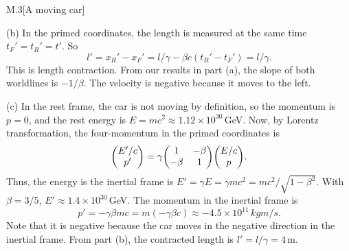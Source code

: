 \documentclass[12pt]{article}
\begin{document}
\begin{problem}{M.3}[A moving car]
\begin{solution}
(b) In the primed coordinates, the length is measured at the same time
$t_F'=t_R'=t'$. So
\begin{equation}
    l'=x_R'-x_F'=l/\gamma-\beta c(t_R'-t_F')=l/\gamma.
\end{equation}
This is length contraction. From our results in part (a), the slope of both
worldlines is $-1/\beta$. The velocity is negative because it moves to the left.

(c) In the rest frame, the car is not moving by definition, so the momentum is
$p=0$, and the rest energy is $E=mc^2\approx1.12\times10^{30}$\,\si{GeV}. Now,
by Lorentz transformation, the four-momentum in the primed coordinates is
\begin{equation}
    \mqty(E'/c\\p')=\gamma\mqty(1&-\beta\\-\beta&1)\mqty(E/c\\p).
\end{equation}
Thus, the energy is the inertial frame is $E'=\gamma E=\gamma
mc^2=mc^2/\sqrt{1-\beta^2}$. With $\beta=3/5$,
$E'\approx1.4\times10^{30}$\,\si{GeV}. The momentum in the inertial frame is
\begin{equation}
    p'=-\gamma\beta mc=m(-\gamma \beta c)
    \approx-4.5\times10^{11}\,\si{kg m/s}.
\end{equation}
Note that it is negative because the car moves in the negative direction in the
inertial frame. From part (b), the contracted length is $l'=l/\gamma=4$\,\si{m}.
\end{solution}
\end{problem}
\newpage
\end{document}
